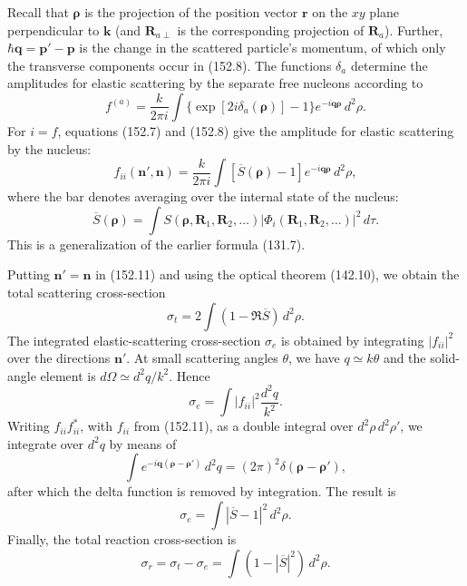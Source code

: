 Recall that $\boldsymbol\rho$ is the projection of the position vector $\mathbf r$ on the $xy$ plane perpendicular to $\mathbf k$ (and $\mathbf R_{a\perp}$ is the corresponding projection of $\mathbf R_a$). Further, $\hbar\mathbf q=\mathbf p'-\mathbf p$ is the change in the scattered particle's momentum, of which only the transverse components occur in (152.8). The functions $\delta_a$ determine the amplitudes for elastic scattering by the separate free nucleons according to
\begin{equation}
 f^{(a)}=\frac{k}{2\pi i}\int\{\exp[2i\delta_a(\boldsymbol\rho)]-1\}e^{-i\mathbf q\boldsymbol\rho}\,d^2\rho.
 \tag{152.10}
\end{equation}
For $i=f$, equations (152.7) and (152.8) give the amplitude for elastic scattering by the nucleus:
\begin{equation}
 f_{ii}(\mathbf n',\mathbf n)=\frac{k}{2\pi i}\int[\overline S(\boldsymbol\rho)-1]e^{-i\mathbf q\boldsymbol\rho}\,d^2\rho,
 \tag{152.11}
\end{equation}
where the bar denotes averaging over the internal state of the nucleus:
\begin{equation}
 \overline S(\boldsymbol\rho)=\int S(\boldsymbol\rho,\mathbf R_1,\mathbf R_2,\ldots)|\Phi_i(\mathbf R_1,\mathbf R_2,\ldots)|^2\,d\tau.
 \tag{152.12}
\end{equation}
This is a generalization of the earlier formula (131.7).

Putting $\mathbf n'=\mathbf n$ in (152.11) and using the optical theorem (142.10), we obtain the total scattering cross-section
\begin{equation}
 \sigma_t=2\int(1-\Re\overline S)\,d^2\rho.
 \tag{152.13}
\end{equation}
The integrated elastic-scattering cross-section $\sigma_e$ is obtained by integrating $|f_{ii}|^2$ over the directions $\mathbf n'$. At small scattering angles $\theta$, we have $q\simeq k\theta$ and the solid-angle element is $d\Omega\simeq d^2q/k^2$. Hence
\[
 \sigma_e=\int|f_{ii}|^2\frac{d^2q}{k^2}.
\]
Writing $f_{ii}f_{ii}^*$, with $f_{ii}$ from (152.11), as a double integral over $d^2\rho\,d^2\rho'$, we integrate over $d^2q$ by means of
\[
 \int e^{-i\mathbf q(\boldsymbol\rho-\boldsymbol\rho')}\,d^2q=(2\pi)^2\delta(\boldsymbol\rho-\boldsymbol\rho'),
\]
after which the delta function is removed by integration. The result is
\begin{equation}
 \sigma_e=\int|\overline S-1|^2\,d^2\rho.
 \tag{152.14}
\end{equation}
Finally, the total reaction cross-section is
\begin{equation}
 \sigma_r=\sigma_t-\sigma_e=\int(1-|\overline S|^2)\,d^2\rho.
 \tag{152.15}
\end{equation}

